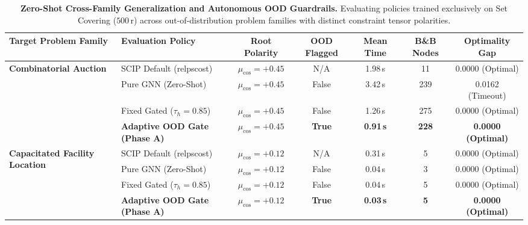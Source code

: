 \begin{table}[t]
\centering
\caption{\textbf{Zero-Shot Cross-Family Generalization and Autonomous OOD Guardrails.} Evaluating policies trained exclusively on Set Covering ($500\,\text{r}$) across out-of-distribution problem families with distinct constraint tensor polarities.}
\label{tab:cross_family}
\small
\begin{tabular}{llccccc}
\toprule
\textbf{Target Problem Family} & \textbf{Evaluation Policy} & \textbf{Root Polarity} & \textbf{OOD Flagged} & \textbf{Mean Time} & \textbf{B\&B Nodes} & \textbf{Optimality Gap} \\
\midrule
\multirow{4}{*}{\textbf{Combinatorial Auction}}
 & SCIP Default (relpscost) & $\mu_{\text{cos}} = +0.45$ & N/A & 1.98\,s & 11 & 0.0000 (Optimal) \\
 & Pure GNN (Zero-Shot) & $\mu_{\text{cos}} = +0.45$ & False & 3.42\,s & 239 & 0.0162 (Timeout) \\
 & Fixed Gated ($\tau_h{=}0.85$) & $\mu_{\text{cos}} = +0.45$ & False & 1.26\,s & 275 & 0.0000 (Optimal) \\
 & \textbf{Adaptive OOD Gate (Phase A)} & $\mu_{\text{cos}} = +0.45$ & \textbf{True} & \textbf{0.91\,s} & \textbf{228} & \textbf{0.0000 (Optimal)} \\
\midrule
\multirow{4}{*}{\textbf{Capacitated Facility Location}}
 & SCIP Default (relpscost) & $\mu_{\text{cos}} = +0.12$ & N/A & 0.31\,s & 5 & 0.0000 (Optimal) \\
 & Pure GNN (Zero-Shot) & $\mu_{\text{cos}} = +0.12$ & False & 0.04\,s & 3 & 0.0000 (Optimal) \\
 & Fixed Gated ($\tau_h{=}0.85$) & $\mu_{\text{cos}} = +0.12$ & False & 0.04\,s & 5 & 0.0000 (Optimal) \\
 & \textbf{Adaptive OOD Gate (Phase A)} & $\mu_{\text{cos}} = +0.12$ & \textbf{True} & \textbf{0.03\,s} & \textbf{5} & \textbf{0.0000 (Optimal)} \\
\bottomrule
\end{tabular}
\end{table}
